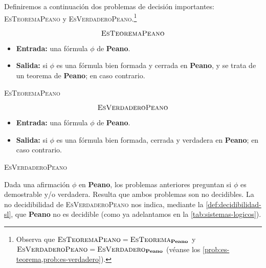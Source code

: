 Definiremos a continuación dos problemas de decisión importantes: \textsc{EsTeoremaPeano} y \textsc{EsVerdaderoPeano}.\footnote{Observa que $\text{\textsc{EsTeoremaPeano}} = \text{\textsc{EsTeorema}}_\textbf{Peano}$ y $\text{\textsc{EsVerdaderoPeano}} = \text{\textsc{EsVerdadero}}_\textbf{Peano}$ (véanse los \cref{prob:es-teorema,prob:es-verdadero}).}
\vfill
\vspace{8pt}
\begin{problema}
\begin{framed}
$$\text{\textsc{EsTeoremaPeano}}$$

\begin{itemize}
    \item \textbf{Entrada:} una fórmula $\phi$ de \textbf{Peano}.
    \item \textbf{Salida:}  si $\phi$ es una fórmula bien formada y cerrada en \textbf{Peano}, y se trata de un teorema de \textbf{Peano};  en caso contrario.
\end{itemize}
\end{framed}
\caption{\textsc{EsTeoremaPeano}}
\label{prob:es-teorema-peano}
\end{problema}
\vfill
\pagebreak
\begin{problema}
\begin{framed}
$$\text{\textsc{EsVerdaderoPeano}}$$

\begin{itemize}
    \item \textbf{Entrada:} una fórmula $\phi$ de \textbf{Peano}.
    \item \textbf{Salida:}  si $\phi$ es una fórmula bien formada, cerrada y verdadera en \textbf{Peano};  en caso contrario.
\end{itemize}
\end{framed}
\caption{\textsc{EsVerdaderoPeano}}
\label{prob:es-verdadero-peano}
\end{problema}

Dada una afirmación $\phi$ en \textbf{Peano}, los problemas anteriores preguntan si $\phi$ es demostrable y/o verdadera. Resulta que ambos problemas son no decidibles. La no decidibilidad de \textsc{EsVerdaderoPeano} nos indica, mediante la \cref{def:decidibilidad-sl}, que \textbf{Peano} no es decidible (como ya adelantamos en la \cref{tab:sistemas-logicos}). \cite{MacCormick2018}

